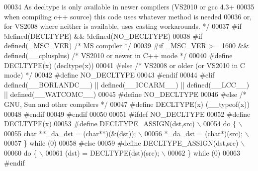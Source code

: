 \begin{DoxyCode}
00034 \textcolor{comment}{   As decltype is only available in newer compilers (VS2010 or gcc 4.3+}
00035 \textcolor{comment}{   when compiling c++ source) this code uses whatever method is needed}
00036 \textcolor{comment}{   or, for VS2008 where neither is available, uses casting workarounds. */}
00037 \textcolor{preprocessor}{#if !defined(DECLTYPE) && !defined(NO\_DECLTYPE)}
00038 \textcolor{preprocessor}{#if defined(\_MSC\_VER)   }\textcolor{comment}{/* MS compiler */}\textcolor{preprocessor}{}
00039 \textcolor{preprocessor}{#if \_MSC\_VER >= 1600 && defined(\_\_cplusplus)  }\textcolor{comment}{/* VS2010 or newer in C++ mode */}\textcolor{preprocessor}{}
00040 \textcolor{preprocessor}{#define DECLTYPE(x) (decltype(x))}
00041 \textcolor{preprocessor}{#else                   }\textcolor{comment}{/* VS2008 or older (or VS2010 in C mode) */}\textcolor{preprocessor}{}
00042 \textcolor{preprocessor}{#define NO\_DECLTYPE}
00043 \textcolor{preprocessor}{#endif}
00044 \textcolor{preprocessor}{#elif defined(\_\_BORLANDC\_\_) || defined(\_\_ICCARM\_\_) || defined(\_\_LCC\_\_) || defined(\_\_WATCOMC\_\_)}
00045 \textcolor{preprocessor}{#define NO\_DECLTYPE}
00046 \textcolor{preprocessor}{#else                   }\textcolor{comment}{/* GNU, Sun and other compilers */}\textcolor{preprocessor}{}
00047 \textcolor{preprocessor}{#define DECLTYPE(x) (\_\_typeof(x))}
00048 \textcolor{preprocessor}{#endif}
00049 \textcolor{preprocessor}{#endif}
00050 
00051 \textcolor{preprocessor}{#ifdef NO\_DECLTYPE}
00052 \textcolor{preprocessor}{#define DECLTYPE(x)}
00053 \textcolor{preprocessor}{#define DECLTYPE\_ASSIGN(dst,src)                                                 \(\backslash\)}
00054 \textcolor{preprocessor}{do \{                                                                             \(\backslash\)}
00055 \textcolor{preprocessor}{  char **\_da\_dst = (char**)(&(dst));                                             \(\backslash\)}
00056 \textcolor{preprocessor}{  *\_da\_dst = (char*)(src);                                                       \(\backslash\)}
00057 \textcolor{preprocessor}{\} while (0)}
00058 \textcolor{preprocessor}{#else}
00059 \textcolor{preprocessor}{#define DECLTYPE\_ASSIGN(dst,src)                                                 \(\backslash\)}
00060 \textcolor{preprocessor}{do \{                                                                             \(\backslash\)}
00061 \textcolor{preprocessor}{  (dst) = DECLTYPE(dst)(src);                                                    \(\backslash\)}
00062 \textcolor{preprocessor}{\} while (0)}
00063 \textcolor{preprocessor}{#endif}

\end{DoxyCode}
